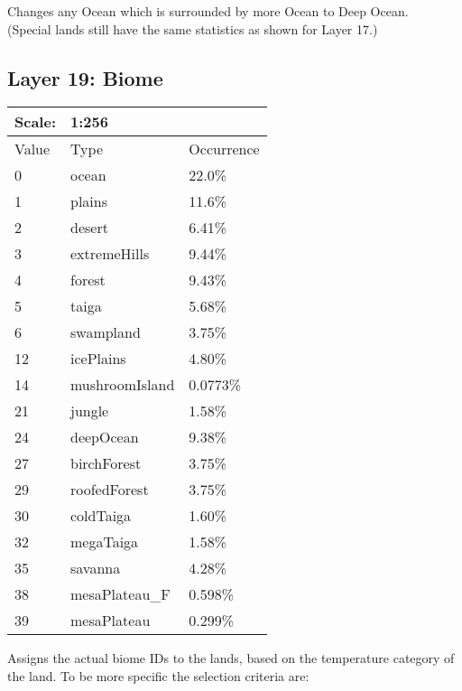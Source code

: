 \documentclass{article}
\begin{document}
	\medskip\noindent
	Changes any Ocean which is surrounded by more Ocean to Deep Ocean.\\
	(Special lands still have the same statistics as shown for Layer 17.)
	
	
	\subsection{Layer 19: Biome}
	\begin{tabular}{|l|l|l|}\hline
		Scale: & \multicolumn{2}{|l|}{1:256} \\\hline\hline
		Value  & Type           & Occurrence \\\hline
		0      & ocean          & 22.0\%\\\hline
		1      & plains         & 11.6\%\\\hline
		2      & desert         & 6.41\%\\\hline
		3      & extremeHills   & 9.44\%\\\hline
		4      & forest         & 9.43\%\\\hline
		5      & taiga          & 5.68\%\\\hline
		6      & swampland      & 3.75\%\\\hline
		12     & icePlains      & 4.80\%\\\hline
		14     & mushroomIsland & 0.0773\%\\\hline
		21     & jungle         & 1.58\%\\\hline
		24     & deepOcean      & 9.38\%\\\hline
		27     & birchForest    & 3.75\%\\\hline
		29     & roofedForest   & 3.75\%\\\hline
		30     & coldTaiga      & 1.60\%\\\hline
		32     & megaTaiga      & 1.58\%\\\hline
		35     & savanna        & 4.28\%\\\hline
		38     & mesaPlateau\_F & 0.598\%\\\hline
		39     & mesaPlateau    & 0.299\%\\\hline
	\end{tabular}

	\medskip\noindent
	Assigns the actual biome IDs to the lands, based on the temperature category of the land. To be more specific the selection criteria are: 
	
\end{document}
